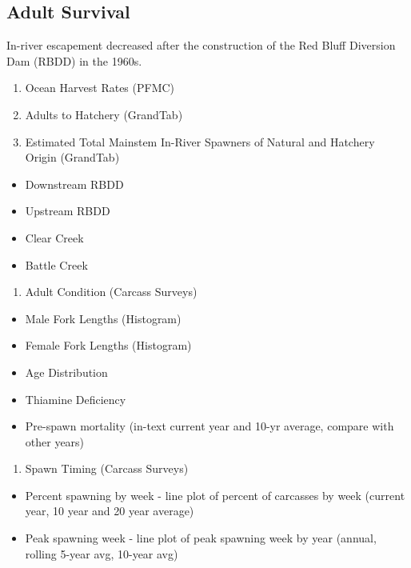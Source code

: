 \documentclass[
]{book}
\providecommand{\tightlist}{%
  \setlength{\itemsep}{0pt}\setlength{\parskip}{0pt}}
\theoremstyle{definition}
\theoremstyle{definition}
\theoremstyle{definition}
\theoremstyle{definition}
\theoremstyle{remark}
\begin{document}
\hypertarget{adult-survival}{%
\subsection{Adult Survival}\label{adult-survival}}

In-river escapement decreased after the construction of the Red Bluff Diversion Dam (RBDD) in the 1960s.

\begin{enumerate}
\def\labelenumi{\arabic{enumi}.}
\item
  Ocean Harvest Rates (PFMC)
\item
  Adults to Hatchery (GrandTab)
\item
  Estimated Total Mainstem In-River Spawners of Natural and Hatchery Origin (GrandTab)
\end{enumerate}

\begin{itemize}
\tightlist
\item
  Downstream RBDD
\item
  Upstream RBDD
\item
  Clear Creek
\item
  Battle Creek
\end{itemize}

\begin{enumerate}
\def\labelenumi{\arabic{enumi}.}
\setcounter{enumi}{3}
\tightlist
\item
  Adult Condition (Carcass Surveys)
\end{enumerate}

\begin{itemize}
\tightlist
\item
  Male Fork Lengths (Histogram)
\item
  Female Fork Lengths (Histogram)
\item
  Age Distribution
\item
  Thiamine Deficiency
\item
  Pre-spawn mortality (in-text current year and 10-yr average, compare with other years)
\end{itemize}

\begin{enumerate}
\def\labelenumi{\arabic{enumi}.}
\setcounter{enumi}{4}
\tightlist
\item
  Spawn Timing (Carcass Surveys)
\end{enumerate}

\begin{itemize}
\tightlist
\item
  Percent spawning by week - line plot of percent of carcasses by week (current year, 10 year and 20 year average)
\item
  Peak spawning week - line plot of peak spawning week by year (annual, rolling 5-year avg, 10-year avg)
\end{itemize}
\end{document}
